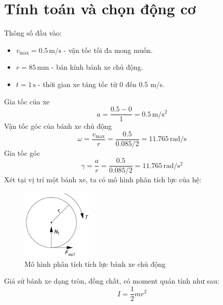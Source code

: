     \section{Tính toán và chọn động cơ}
        \hspace*{0.6cm}Thông số đầu vào:
        \begin{itemize}
            \item $v_{\text{max}} = 0.5 \,\mathrm{m/s}$ - vận tốc tối đa mong muốn.
            \item $r = 85 \,\mathrm{mm}$ - bán kính bánh xe chủ động.
            \item $t = 1 \,\mathrm{s}$ - thời gian xe tăng tốc từ 0 đến 0.5 m/s.
        \end{itemize}
        \hspace*{0.6cm}Gia tốc của xe
        \begin{equation*}
            a = \dfrac{0.5 - 0}{1} = 0.5 \,\mathrm{m/s^2}
        \end{equation*}
        \hspace{0.6cm}Vận tốc góc của bánh xe chủ động
        \begin{equation*}
            \omega = \dfrac{v_{\text{max}}}{r} = \dfrac{0.5}{0.085/2} = 11.765 \,\mathrm{rad/s}
        \end{equation*}
        \hspace*{0.6cm}Gia tốc góc
        \begin{equation*}
            \gamma = \frac{a}{r} = \dfrac{0.5}{0.085/2} = 11.765 \,\mathrm{rad/s^2}
        \end{equation*}
        \hspace*{0.6cm}Xét tại vị trí một bánh xe, ta có mô hình phân tích lực của hệ:
        \begin{figure}[H]
            \centering
            \includegraphics[width=0.3\textwidth]{pictures/chapter3/banhxe.png}
            \caption{Mô hình phân tích tích lực bánh xe chủ động}
            \label{phantich_banhxe}
        \end{figure}
        Giả sử bánh xe dạng tròn, đồng chất, có moment quán tính như sau:
        \begin{equation}
            I = \dfrac{1}{2}mr^2
            \label{eq:3.10}
        \end{equation}
